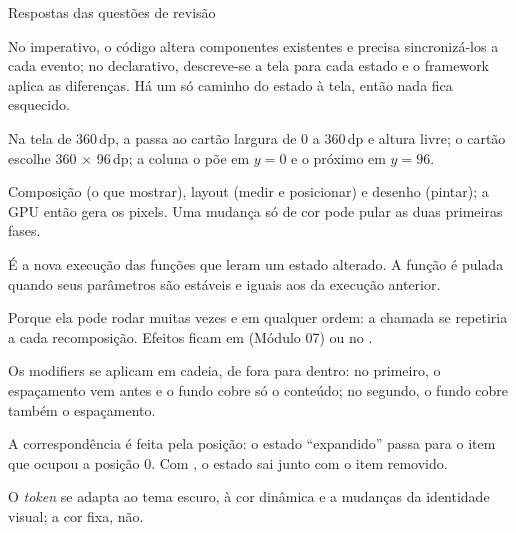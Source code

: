 \documentclass[aspectratio=169,10pt]{beamer}
\begin{document}
\begin{frame}{Respostas das questões de revisão}
  \begin{respostas}
    \item No imperativo, o código altera componentes existentes e precisa sincronizá-los a cada evento; no declarativo, descreve-se a tela para cada estado e o framework aplica as diferenças. Há um só caminho do estado à tela, então nada fica esquecido.
    \item Na tela de 360\,dp, a  passa ao cartão largura de 0 a 360\,dp e altura livre; o cartão escolhe 360 $\times$ 96\,dp; a coluna o põe em $y = 0$ e o próximo em $y = 96$.
    \item Composição (o que mostrar), layout (medir e posicionar) e desenho (pintar); a GPU então gera os pixels. Uma mudança só de cor pode pular as duas primeiras fases.
    \item É a nova execução das funções que leram um estado alterado. A função é pulada quando seus parâmetros são estáveis e iguais aos da execução anterior.
    \item Porque ela pode rodar muitas vezes e em qualquer ordem: a chamada se repetiria a cada recomposição. Efeitos ficam em  (Módulo 07) ou no .
    \item Os modifiers se aplicam em cadeia, de fora para dentro: no primeiro, o espaçamento vem antes e o fundo cobre só o conteúdo; no segundo, o fundo cobre também o espaçamento.
    \item A correspondência é feita pela posição: o estado ``expandido'' passa para o item que ocupou a posição 0. Com , o estado sai junto com o item removido.
    \item O \emph{token} se adapta ao tema escuro, à cor dinâmica e a mudanças da identidade visual; a cor fixa, não.
  \end{respostas}
\end{frame}

\end{document}
